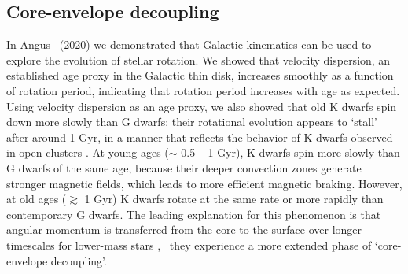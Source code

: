 
\subsection{Core-envelope decoupling}

In Angus \etal\ (2020) we demonstrated that Galactic kinematics can be used to
explore the evolution of stellar rotation.
We showed that velocity dispersion, an established age proxy in the Galactic
thin disk, increases smoothly as a function of rotation period, indicating
that rotation period increases with age as expected.
Using velocity dispersion as an age proxy, we also showed that old K dwarfs
spin down more slowly than G dwarfs: their rotational evolution appears to
`stall' after around 1 Gyr, in a manner that reflects the behavior of K dwarfs
observed in open clusters \citep{curtis2019}.
At young ages ($\sim$ 0.5 -- 1 Gyr), K dwarfs spin more slowly than G dwarfs of
the same age, because their deeper convection zones generate stronger magnetic
fields, which leads to more efficient magnetic braking.
However, at old ages ($\gtrsim$ 1 Gyr) K dwarfs rotate at the same rate or
more rapidly than contemporary G dwarfs.
The leading explanation for this phenomenon is that angular momentum is
transferred from the core to the surface over longer timescales for lower-mass
stars \citep{spada2019}, \ie\ they experience a more extended phase of
`core-envelope decoupling'.

